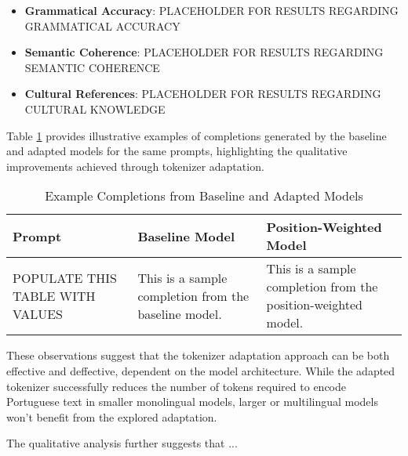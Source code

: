 \begin{itemize}
    \item \textbf{Grammatical Accuracy}: PLACEHOLDER FOR RESULTS REGARDING GRAMMATICAL ACCURACY
    
    \item \textbf{Semantic Coherence}: PLACEHOLDER FOR RESULTS REGARDING SEMANTIC COHERENCE
    
    \item \textbf{Cultural References}: PLACEHOLDER FOR RESULTS REGARDING CULTURAL KNOWLEDGE
\end{itemize}

Table \ref{tab:example_completions} provides illustrative examples of completions generated by the baseline and adapted models for the same prompts, highlighting the qualitative improvements achieved through tokenizer adaptation.

\begin{table}[h]
\centering
\caption{Example Completions from Baseline and Adapted Models}
\label{tab:example_completions}
\begin{tabular}{p{4cm}p{5cm}p{5cm}}
\hline
\textbf{Prompt} & \textbf{Baseline Model} & \textbf{Position-Weighted Model} \\
\hline
POPULATE THIS TABLE WITH VALUES & This is a sample completion from the baseline model. & This is a sample completion from the position-weighted model. \\
\hline
\end{tabular}
\end{table}

These observations suggest that the tokenizer adaptation approach can be both effective and deffective, dependent on the model architecture. While the adapted tokenizer successfully reduces the number of tokens required to encode Portuguese text in smaller monolingual models, larger or multilingual  models won't benefit from the explored adaptation.

The qualitative analysis further suggests that ...